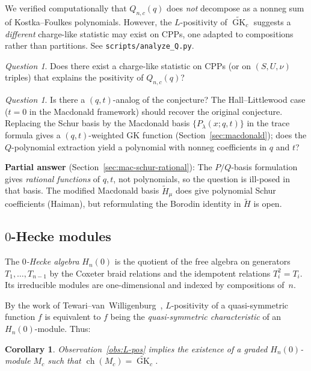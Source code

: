 \documentclass[11pt]{article}
\theoremstyle{plain}
\newtheorem{corollary}[theorem]{Corollary}
\theoremstyle{definition}
\theoremstyle{remark}
\newtheorem{question}[theorem]{Question}
\newcommand{\GK}{\operatorname{GK}}
\begin{document}
We verified computationally that $Q_{n,c}(q)$ does \emph{not}
decompose as a nonneg sum of Kostka--Foulkes polynomials.
However, the $L$-positivity of $\widetilde{\GK}_c$ suggests
a \emph{different} charge-like statistic may exist on CPPs,
one adapted to compositions rather than partitions.
See \texttt{scripts/analyze\_Q.py}.

\begin{question}\label{q:charge-statistic}
Does there exist a charge-like statistic on CPPs
(or on $(S,U,\nu)$ triples) that explains the positivity
of $Q_{n,c}(q)$?
\end{question}

\begin{question}\label{q:qt-analog}
Is there a $(q,t)$-analog of the conjecture?
The Hall--Littlewood case ($t = 0$ in the Macdonald framework)
should recover the original conjecture.  Replacing the Schur
basis by the Macdonald basis $\{P_\lambda(x;q,t)\}$ in the trace
formula gives a $(q,t)$-weighted GK function
(Section~\ref{sec:macdonald}); does the
$Q$-polynomial extraction yield a polynomial with
nonneg coefficients in $q$ and $t$?

\textbf{Partial answer} (Section~\ref{sec:mac-schur-rational}):
The $P/Q$-basis formulation gives \emph{rational functions}
of $q,t$, not polynomials, so the question is ill-posed
in that basis. The modified Macdonald basis $\tilde{H}_\mu$
does give polynomial Schur coefficients (Haiman), but
reformulating the Borodin identity in $\tilde{H}$ is open.
\end{question}

\subsection{$0$-Hecke modules}

The \emph{$0$-Hecke algebra} $H_n(0)$ is the quotient of the free
algebra on generators $T_1, \ldots, T_{n-1}$ by the Coxeter braid
relations and the idempotent relations $T_i^2 = T_i$.
Its irreducible modules are one-dimensional and indexed by
compositions of~$n$.

By the work of Tewari--van~Willigenburg~\cite{tewari-vanwilligenburg},
$L$-positivity of a quasi-symmetric function $f$ is equivalent to
$f$ being the \emph{quasi-symmetric characteristic} of an
$H_n(0)$-module. Thus:

\begin{corollary}
Observation~\ref{obs:L-pos} implies the existence of a graded
$H_n(0)$-module $M_c$ such that
$\operatorname{ch}(M_c) = \widetilde{\GK}_c$.
\end{corollary}
\end{document}
